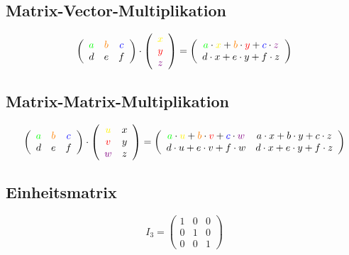 \subsection{Matrix-Vector-Multiplikation}
\[\left(\begin{array}{ccc}
{\color{green}a} & {\color{orange}b} & {\color{blue}c}\\
d & e & f
\end{array}\right)\cdot
\left(\begin{array}{c}
{\color{yellow}x}\\
{\color{red}y}\\
{\color{violet}z}
\end{array}\right)=
\left(\begin{array}{ccc}
{\color{green}a}\cdot{\color{yellow}x}+{\color{orange}b}\cdot{\color{red}y}+{\color{blue}c}\cdot{\color{violet}z}\\
d\cdot x+e\cdot y+f\cdot z
\end{array}\right)\]

\subsection{Matrix-Matrix-Multiplikation}
\[\left(\begin{array}{ccc}
{\color{green}a} & {\color{orange}b} & {\color{blue}c}\\
d & e & f
\end{array}\right)\cdot
\left(\begin{array}{cc}
{\color{yellow}u}&x\\
{\color{red}v}&y\\
{\color{violet}w}&z
\end{array}\right)=
\left(\begin{array}{cc}
{\color{green}a}\cdot{\color{yellow}u}+{\color{orange}b}\cdot{\color{red}v}+{\color{blue}c}\cdot{\color{violet}w} & a\cdot x+b\cdot y+c\cdot z\\
d\cdot u+e\cdot v+f\cdot w  & d\cdot x+e\cdot y+f\cdot z
\end{array}\right)\]



\subsection{Einheitsmatrix}
\[
I_3=\left(\begin{array}{ccc}
1 & 0 & 0\\
0 & 1 & 0\\
0 & 0 & 1
\end{array}\right)
\]

